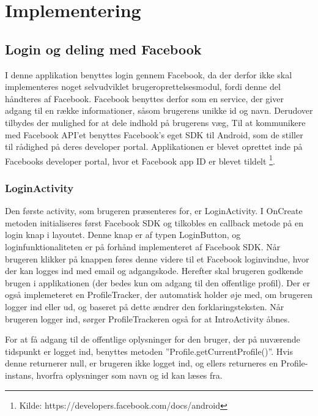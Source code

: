 \thispagestyle{fancy}
\chapter{Implementering}
\label{chp:Implementering}

\section{Login og deling med Facebook}
I denne applikation benyttes login gennem Facebook, da der derfor ikke skal implementeres noget selvudviklet brugeroprettelsesmodul, fordi denne del håndteres af Facebook. Facebook benyttes derfor som en service, der giver adgang til en række informationer, såsom brugerens unikke id og navn. Derudover tilbydes der mulighed for at dele indhold på brugerens væg, Til at kommunikere med Facebook API’et benyttes Facebook’s eget SDK til Android, som de stiller til rådighed på deres developer portal. Applikationen er blevet oprettet inde på Facebooks developer portal, hvor et Facebook app ID er blevet tildelt \footnote{Kilde: https://developers.facebook.com/docs/android}.

\subsection{LoginActivity}
Den første activity, som brugeren præsenteres for, er LoginActivity. I OnCreate metoden initialiseres først Facebook SDK og tilkobles en callback metode på en login knap i layoutet. Denne knap er af typen LoginButton, og loginfunktionaliteten er på forhånd implementeret af Facebook SDK. Når brugeren klikker på knappen føres denne videre til et Facebook loginvindue, hvor der kan logges ind med email og adgangskode. Herefter skal brugeren godkende brugen i applikationen (der bedes kun om adgang til den offentlige profil). Der er også implemeteret en ProfileTracker, der automatisk holder øje med, om brugeren logger ind eller ud, og baseret på dette ændrer den forklaringsteksten. Når brugeren logger ind, sørger ProfileTrackeren også for at IntroActivity åbnes.

For at få adgang til de offentlige oplysninger for den bruger, der på nuværende tidspunkt er logget ind, benyttes metoden ”Profile.getCurrentProfile()”. Hvis denne returnerer null, er brugeren ikke logget ind, og ellers returneres en Profile-instans, hvorfra oplysninger som navn og id kan læses fra.


